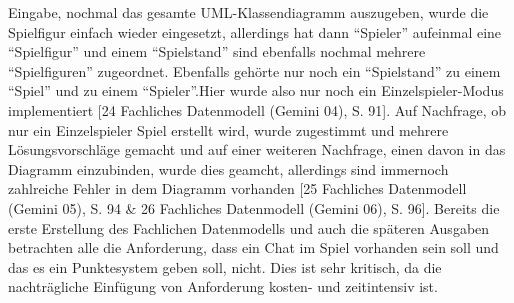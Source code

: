 Eingabe, nochmal das gesamte UML-Klassendiagramm auszugeben, wurde die Spielfigur einfach wieder eingesetzt, allerdings hat dann ``Spieler'' aufeinmal eine ``Spielfigur''
und  einem ``Spielstand'' sind ebenfalls nochmal mehrere ``Spielfiguren'' zugeordnet. Ebenfalls gehörte nur noch ein ``Spielstand'' zu einem ``Spiel'' 
und zu einem ``Spieler''.Hier wurde also nur noch ein Einzelspieler-Modus implementiert [24 Fachliches Datenmodell (Gemini 04), S. 91]. 
Auf Nachfrage, ob nur ein Einzelspieler Spiel erstellt wird, wurde zugestimmt und mehrere Lösungsvorschläge gemacht und auf einer weiteren
Nachfrage, einen davon in das Diagramm einzubinden, wurde dies geamcht, allerdings sind immernoch zahlreiche Fehler in dem Diagramm vorhanden 
[25 Fachliches Datenmodell (Gemini 05), S. 94 \& 26 Fachliches Datenmodell (Gemini 06), S. 96]. Bereits die erste Erstellung 
des Fachlichen Datenmodells und auch die späteren Ausgaben betrachten alle die Anforderung, dass ein Chat im Spiel vorhanden sein soll und das es ein Punktesystem 
geben soll, nicht. Dies ist sehr kritisch, da die nachträgliche Einfügung von Anforderung kosten- und zeitintensiv ist.\\

